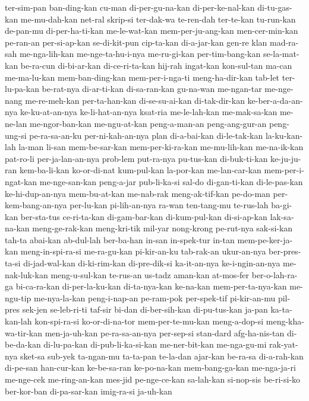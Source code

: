 {ter-sim-pan ban-ding-kan cu-man di-per-gu-na-kan di-per-ke-nal-kan di-tu-gas-kan me-mu-dah-kan net-ral
skrip-si ter-dak-wa te-ren-dah ter-te-kan tu-run-kan de-pan-mu di-per-ha-ti-kan me-le-wat-kan
mem-per-ju-ang-kan men-cer-min-kan pe-ran-an per-si-ap-kan se-di-kit-pun cip-ta-kan di-a-jar-kan gen-re
klan mad-ra-sah me-nga-lih-kan me-nge-ta-hu-i-nya me-ru-gi-kan per-tim-bang-kan se-la-mat-kan be-ra-cun
di-bi-ar-kan di-ce-ri-ta-kan hij-rah ingat-kan kon-sul-tan ma-can me-ma-lu-kan mem-ban-ding-kan
mem-per-i-nga-ti meng-ha-dir-kan tab-let ter-lu-pa-kan be-rat-nya di-ar-ti-kan di-sa-ran-kan gu-na-wan
me-ngan-tar me-nge-nang me-re-meh-kan per-ta-han-kan di-se-su-ai-kan di-tak-dir-kan ke-ber-a-da-an-nya ke-ku-at-an-nya
ke-li-hat-an-nya ksat-ria me-le-lah-kan me-mak-sa-kan me-ne-lan me-ngor-ban-kan me-ngu-at-kan peng-a-man-an
peng-ang-gur-an peng-ung-si pe-ra-sa-an-ku per-ni-kah-an-nya plan di-a-bai-kan di-le-tak-kan la-ku-kan-lah
la-man li-san mem-be-sar-kan mem-per-ki-ra-kan me-mu-lih-kan me-na-ik-kan pat-ro-li per-ja-lan-an-nya
prob-lem put-ra-nya pu-tus-kan di-buk-ti-kan ke-ju-ju-ran kem-ba-li-kan ko-or-di-nat kum-pul-kan
la-por-kan me-lan-car-kan mem-per-i-ngat-kan me-nge-san-kan peng-a-jar pub-li-ka-si sal-do di-gan-ti-kan
di-le-pas-kan ke-hi-dup-an-nya mem-bu-at-kan me-nab-rak meng-ak-tif-kan pe-do-man per-kem-bang-an-nya per-lu-kan
pi-lih-an-nya ra-wan ten-tang-mu te-rus-lah ba-gi-kan ber-sta-tus ce-ri-ta-kan di-gam-bar-kan
di-kum-pul-kan di-si-ap-kan lak-sa-na-kan meng-ge-rak-kan meng-kri-tik mil-yar nong-krong pe-rut-nya
sak-si-kan tah-ta abai-kan ab-dul-lah ber-ba-han in-san in-spek-tur in-tan
mem-pe-ker-ja-kan meng-in-spi-ra-si me-ra-gu-kan pi-kir-an-ku tab-rak-an ukur-an-nya ber-pres-ta-si di-jad-wal-kan
di-ki-rim-kan di-pre-dik-si ka-it-an-nya ke-i-ngin-an-nya me-nak-luk-kan meng-u-sul-kan te-rus-an us-tadz
aman-kan at-mos-fer ber-o-lah-ra-ga bi-ca-ra-kan di-per-la-ku-kan di-ta-nya-kan ke-na-kan mem-per-ta-nya-kan
me-ngu-tip me-nya-la-kan peng-i-nap-an pe-ram-pok per-spek-tif pi-kir-an-mu pil-pres sek-jen
se-leb-ri-ti taf-sir bi-dan di-ber-sih-kan di-pu-tus-kan ja-pan ka-ta-kan-lah kon-spi-ra-si
ko-or-di-na-tor mem-per-te-mu-kan meng-a-dop-si meng-kha-wa-tir-kan men-ja-uh-kan pe-ra-sa-an-nya per-sep-si stan-dard
afg-ha-nis-tan di-be-da-kan di-lu-pa-kan di-pub-li-ka-si-kan me-ner-bit-kan me-nga-gu-mi rak-yat-nya sket-sa
sub-yek ta-ngan-mu ta-ta-pan te-la-dan ajar-kan be-ra-sa di-a-rah-kan di-pe-san
han-cur-kan ke-be-sa-ran ke-po-na-kan mem-bang-ga-kan me-nga-ja-ri me-nge-cek me-ring-an-kan mes-jid
pe-nge-ce-kan sa-lah-kan si-nop-sis be-ri-si-ko ber-kor-ban di-pa-sar-kan imig-ra-si ja-uh-kan
}

